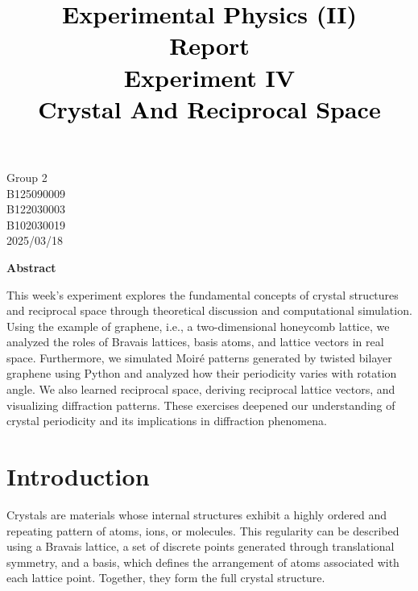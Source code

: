 \documentclass[12pt,a4paper]{article}
\title{\vspace{-0.5cm}
       {\bf \textcolor{black}{{\LARGE 
       \begin{CJK}{UTF8}{bkai}
       Experimental Physics (II)\\
       \vspace{6pt}
        Report\\
       \vspace{60pt}
       Experiment IV\\
       \vspace{6pt}
       Crystal And Reciprocal Space
       \end{CJK}
       }}
       }
       }
\author{}
\date{}
\begin{document}
\begin{CJK}{UTF8}{bkai}

\maketitle
\thispagestyle{empty}

\vspace{10cm}
\begin{center}
{\large Group 2}\\ \vspace{12pt}
{\large {} B125090009}\\ \vspace{6pt}
{\large {}  B122030003}\\ \vspace{6pt}
{\large {} B102030019}\\ \vspace{12pt}
{\large 2025/03/18}\\
\end{center}

\clearpage

\vspace{1cm}
\begin{center}
{\large\bf\sc Abstract}
\end{center}

\noindent 

This week's experiment explores the fundamental concepts of crystal structures and reciprocal space through theoretical discussion and computational simulation. Using the example of graphene, i.e., a two-dimensional honeycomb lattice, we analyzed the roles of Bravais lattices, basis atoms, and lattice vectors in real space. Furthermore, we simulated Moiré patterns generated by twisted bilayer graphene using Python and analyzed how their periodicity varies with rotation angle. We also learned reciprocal space, deriving reciprocal lattice vectors, and visualizing diffraction patterns. These exercises deepened our understanding of crystal periodicity and its implications in diffraction phenomena.

\section{Introduction}
\hfill

Crystals are materials whose internal structures exhibit a highly ordered and repeating pattern of atoms, ions, or molecules. This regularity can be described using a Bravais lattice, a set of discrete points generated through translational symmetry, and a basis, which defines the arrangement of atoms associated with each lattice point. Together, they form the full crystal structure.


\end{CJK}
\end{document}
